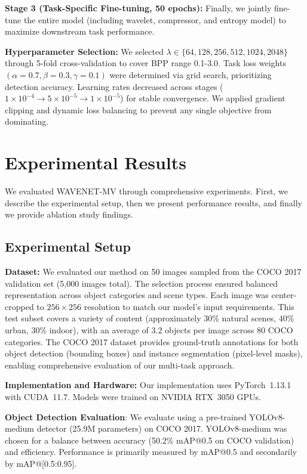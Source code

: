 \documentclass[conference]{IEEEtran}
\begin{document}
\textbf{Stage 3 (Task-Specific Fine-tuning, 50 epochs):} Finally, we jointly fine-tune the entire model (including wavelet, compressor, and entropy model) to maximize downstream task performance. 


\textbf{Hyperparameter Selection:} We selected $\lambda \in \{64, 128, 256, 512, 1024, 2048\}$ through 5-fold cross-validation to cover BPP range 0.1-3.0. Task loss weights $(\alpha=0.7, \beta=0.3, \gamma=0.1)$ were determined via grid search, prioritizing detection accuracy. Learning rates decreased across stages ($1\times 10^{-4} \to 5\times 10^{-5} \to 1\times 10^{-5}$) for stable convergence. We applied gradient clipping and dynamic loss balancing to prevent any single objective from dominating. 

\section{Experimental Results}

We evaluated WAVENET-MV through comprehensive experiments. First, we describe the experimental setup, then we present performance results, and finally we provide ablation study findings.

\subsection{Experimental Setup}

\textbf{Dataset:} We evaluated our method on 50 images sampled from the COCO 2017 validation set (5,000 images total). The selection process ensured balanced representation across object categories and scene types. Each image was center-cropped to $256\times 256$ resolution to match our model's input requirements. This test subset covers a variety of content (approximately 30\% natural scenes, 40\% urban, 30\% indoor), with an average of 3.2 objects per image across 80 COCO categories. The COCO 2017 dataset provides ground-truth annotations for both object detection (bounding boxes) and instance segmentation (pixel-level masks), enabling comprehensive evaluation of our multi-task approach.

\textbf{Implementation and Hardware:} Our implementation uses PyTorch~1.13.1 with CUDA~11.7. Models were trained on NVIDIA RTX~3050 GPUs.


\textbf{Object Detection Evaluation}: We evaluate using a pre-trained YOLOv8-medium detector \cite{yolov8_ultralytics2023} (25.9M parameters) on COCO 2017. YOLOv8-medium was chosen for a balance between accuracy (50.2\% mAP@0.5 on COCO validation) and efficiency. Performance is primarily measured by mAP@0.5 and secondarily by mAP@[0.5:0.95]. 
\end{document}
